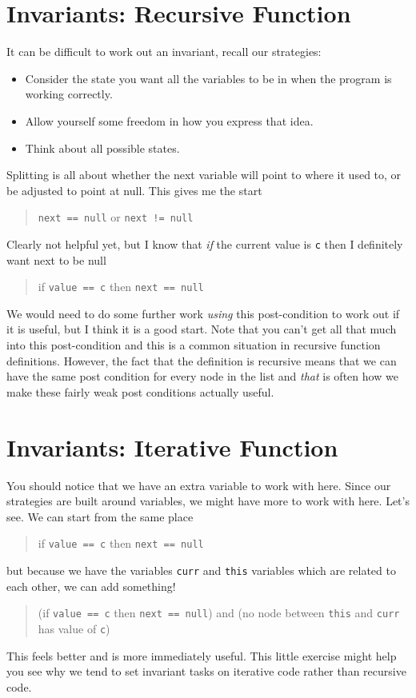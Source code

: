 \documentclass[twoside=false,DIV=14]{scrartcl}
\begin{document}
\section{Invariants: Recursive Function}
It can be difficult to work out an invariant, recall our strategies:
\begin{itemize}
\item Consider the state you want all the variables to be in when the program is working correctly.
\item Allow yourself some freedom in how you express that idea.
\item Think about all possible states.
\end{itemize}
Splitting is all about whether the next variable will point to where it used to, or be adjusted to point at null.  This gives me the start
\begin{quote}
\lstinline|next == null| or \lstinline|next != null|
\end{quote}
Clearly not helpful yet, but I know that \emph{if} the current value is \lstinline|c| then I definitely want next to be null
\begin{quote}
  if \lstinline|value == c| then \lstinline|next == null|
\end{quote}
We would need to do some further work \emph{using} this post-condition to work out if it is useful, but I think it is a good start.  Note that you can't get all that much into this post-condition and this is a common situation in recursive function definitions.  However, the fact that the definition is recursive means that we can have the same post condition for every node in the list and \emph{that} is often how we make these fairly weak post conditions actually useful.

\section{Invariants: Iterative Function}
You should notice that we have an extra variable to work with here.  Since our strategies are built around variables, we might have more to work with here.  Let's see.  We can start from the same place
\begin{quote}
if \lstinline|value == c| then \lstinline|next == null|
\end{quote}
but because we have the variables \lstinline|curr| and \lstinline|this| variables which are related to each other, we can add something!
\begin{quote}
(if \lstinline|value == c| then \lstinline|next == null|) and (no node between \lstinline|this| and \lstinline|curr| has value of \lstinline|c|)
\end{quote}
This feels better and is more immediately useful.  This little exercise might help you see why we tend to set invariant tasks on iterative code rather than recursive code.
\end{document}
